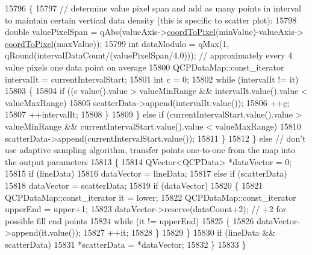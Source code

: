 \begin{DoxyCode}
15796       \{
15797         \textcolor{comment}{// determine value pixel span and add as many points in interval to maintain certain vertical data
       density (this is specific to scatter plot):}
15798         \textcolor{keywordtype}{double} valuePixelSpan = qAbs(valueAxis->\hyperlink{class_q_c_p_axis_a985ae693b842fb0422b4390fe36d299a}{coordToPixel}(minValue)-valueAxis->
      \hyperlink{class_q_c_p_axis_a985ae693b842fb0422b4390fe36d299a}{coordToPixel}(maxValue));
15799         \textcolor{keywordtype}{int} dataModulo = qMax(1, qRound(intervalDataCount/(valuePixelSpan/4.0))); \textcolor{comment}{// approximately every 4
       value pixels one data point on average}
15800         QCPDataMap::const\_iterator intervalIt = currentIntervalStart;
15801         \textcolor{keywordtype}{int} c = 0;
15802         \textcolor{keywordflow}{while} (intervalIt != it)
15803         \{
15804           \textcolor{keywordflow}{if} ((c %
      value().value > valueMinRange && intervalIt.value().value < valueMaxRange)
15805             scatterData->append(intervalIt.value());
15806           ++\hyperlink{_comparision_pictures_2_createtest_image_8m_ae0323a9039add2978bf5b49550572c7c}{c};
15807           ++intervalIt;
15808         \}
15809       \} \textcolor{keywordflow}{else} \textcolor{keywordflow}{if} (currentIntervalStart.value().value > valueMinRange && currentIntervalStart.value().value <
       valueMaxRange)
15810         scatterData->append(currentIntervalStart.value());
15811     \}
15812   \} \textcolor{keywordflow}{else} \textcolor{comment}{// don't use adaptive sampling algorithm, transfer points one-to-one from the map into the output
       parameters}
15813   \{
15814     QVector<QCPData> *dataVector = 0;
15815     \textcolor{keywordflow}{if} (lineData)
15816       dataVector = lineData;
15817     \textcolor{keywordflow}{else} \textcolor{keywordflow}{if} (scatterData)
15818       dataVector = scatterData;
15819     \textcolor{keywordflow}{if} (dataVector)
15820     \{
15821       QCPDataMap::const\_iterator it = lower;
15822       QCPDataMap::const\_iterator upperEnd = upper+1;
15823       dataVector->reserve(dataCount+2); \textcolor{comment}{// +2 for possible fill end points}
15824       \textcolor{keywordflow}{while} (it != upperEnd)
15825       \{
15826         dataVector->append(it.value());
15827         ++it;
15828       \}
15829     \}
15830     \textcolor{keywordflow}{if} (lineData && scatterData)
15831       *scatterData = *dataVector;
15832   \}
15833 \}
\end{DoxyCode}


